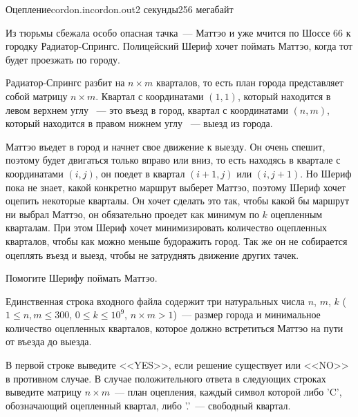 \begin{problem}{Оцепление}{cordon.in}{cordon.out}{2 секунды}{256 мегабайт}
                                                                    

Из тюрьмы сбежала особо опасная тачка~--- Маттэо и уже мчится по Шоссе 66 к городку Радиатор-Спрингс. 
Полицейский Шериф хочет поймать Маттэо, когда тот будет проезжать по городу. 

Радиатор-Спрингс разбит на $n\times m$ кварталов, то есть план города представляет собой матрицу $n\times m$.
Квартал с координатами $(1, 1)$, который находится в левом верхнем углу ~--- это въезд в город, 
квартал с координатами $(n, m)$, который находится в правом нижнем углу ~--- выезд из города.

Маттэо въедет в город и начнет свое движение к выезду. Он очень спешит, поэтому будет двигаться только  
вправо или вниз, то есть находясь в квартале с координатами $(i, j)$, он поедет в квартал $(i+1, j)$ или $(i, j+1)$.
Но Шериф пока не знает, какой конкретно маршрут выберет Маттэо, поэтому Шериф хочет оцепить некоторые кварталы.
Он хочет сделать это так, чтобы какой бы маршрут ни выбрал Маттэо, он обязательно проедет как минимум по $k$ оцепленным кварталам. 
При этом Шериф хочет минимизировать количество оцепленных кварталов, чтобы как можно меньше будоражить город. 
Так же он не собирается оцеплять въезд и выезд, чтобы не затруднять движение других тачек. 

Помогите Шерифу поймать Маттэо.

\InputFile
Единственная строка входного файла содержит три натуральных числа $n$, $m$, $k$ ($1 \le n, m \le 300$, $0 \le k \le 10^9$, $n\times m > 1$)~--- 
размер города и минимальное количество оцепленных кварталов, которое должно встретиться Маттэо на пути от въезда до выезда.

\OutputFile
В первой строке выведите <<YES>>, если решение существует или <<NO>> в противном случае.
В случае положительного ответа в следующих строках выведите матрицу $n\times m$~--- план оцепления, каждый символ которой либо 'C', обозначающий оцепленный квартал, либо
'.'~--- свободный квартал.

\Example
\begin{example}%
%
%
%
\end{example}

\end{problem}
